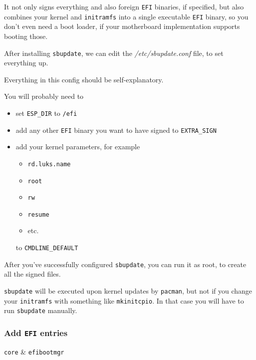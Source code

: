 \documentclass[10pt]{dustdoc}
\begin{document}
It not only signs everything and also foreign \texttt{EFI} binaries, if specified, but also combines your kernel and \texttt{initramfs} into a single executable \texttt{EFI} binary, so you don’t even need a boot loader, if your motherboard implementation supports booting those.

After installing \texttt{sbupdate}, we can edit the \textit{/etc/sbupdate.conf} file, to set everything up.

Everything in this config should be self-explanatory.

You will probably need to

\begin{itemize}
    \item set \texttt{ESP\_DIR} to \texttt{/efi}

    \item add any other \texttt{EFI} binary you want to have signed to \texttt{EXTRA\_SIGN}

    \item add your kernel parameters, for example

        \begin{itemize}
            \item \texttt{rd.luks.name}
            \item \texttt{root}
            \item \texttt{rw}
            \item \texttt{resume}
            \item etc.
        \end{itemize}

        \noindent
        to \texttt{CMDLINE\_DEFAULT}
\end{itemize}

After you’ve successfully configured \texttt{sbupdate}, you can run it as root, to create all the signed files.

\begin{NOTE}
    \texttt{sbupdate} will be executed upon kernel updates by \texttt{pacman}, but not if you change your \texttt{initramfs} with something like \texttt{mkinitcpio}.
    In that case you will have to run \texttt{sbupdate} manually.
\end{NOTE}

\subsubsection{Add \texttt{EFI} entries}
\label{sec:add-efi-entries}

\begin{packagetable}
    \texttt{core} & \texttt{efibootmgr} \\
\end{packagetable}
\end{document}
